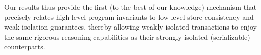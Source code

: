 Our results thus provide the first (to the best of our knowledge)
mechanism that precisely relates high-level program invariants to
low-level store consistency and weak isolation guarantees, thereby
allowing weakly isolated transactions to enjoy the same rigorous
reasoning capabilities as their strongly isolated (serializable)
counterparts.


